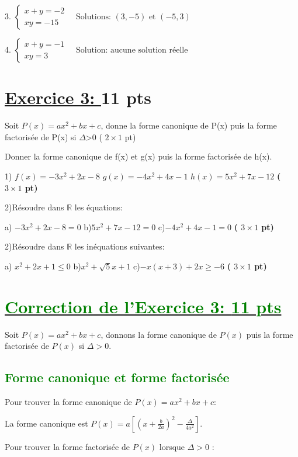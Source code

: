 \documentclass[12pt]{article}
\begin{document}
3. \( \begin{cases}
x + y = -2 \\
xy = -15
\end{cases} \quad \text{Solutions: } (3, -5) \text{ et } (-5, 3) \)

4. \( \begin{cases}
x + y = -1 \\
xy = 3
\end{cases} \quad \text{Solution: aucune solution réelle} \)


\section*{\underline{Exercice 3: }\textbf{11 pts}}
Soit $P(x)=ax^{2}+bx+c$, donne la forme canonique de P(x) puis la forme factorisée de P(x) si $\Delta$>0 ( $2\times 1$ pt)

Donner la forme canonique de f(x) et g(x) puis la forme factorisée de h(x).
  
1) $f(x)=-3x^{2}+2x-8$     $g(x)=-4x^{2}+4x-1$    $h(x)=5x^{2}+7x-12$ \textbf{( $3\times 1$ pt)}

2)Résoudre dans $\mathbb{R}$ les équations:

a) $-3x^{2}+2x-8=0$     b)$5x^{2}+7x-12=0$    c)$-4x^{2}+4x-1=0$ \textbf{( $3\times 1$ pt)}

2)Résoudre dans $\mathbb{R}$ les inéquations suivantes:

a) $x^{2}+2x+1\leq 0$     b)$x^{2}+\sqrt{5} x+1$    c)$-x(x+3)+2x\geq -6$ \textbf{( $3\times 1$ pt)}
\section*{\underline{\textcolor{green}{Correction de l'Exercice 3: \textbf{11 pts}}}}

Soit \( P(x) = ax^{2} + bx + c \), donnons la forme canonique de \( P(x) \) puis la forme factorisée de \( P(x) \) si \( \Delta > 0 \).

\subsection*{\textcolor{green}{Forme canonique et forme factorisée}}

Pour trouver la forme canonique de \( P(x) = ax^{2} + bx + c \):

La forme canonique est \( P(x) = a\left[ \left( x + \frac{b}{2a}\right) ^{2} - \frac{\Delta}{4a^{2}}\right]  \).

Pour trouver la forme factorisée de \( P(x) \) lorsque \( \Delta > 0 \) :
\end{document}

